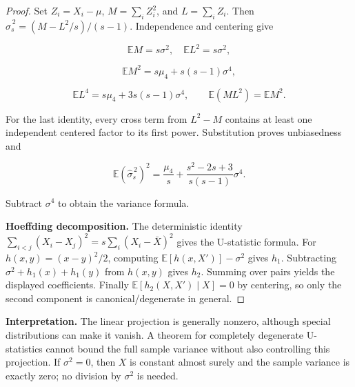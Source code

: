 \begin{proof}
Set $Z_i=X_i-\mu$, $M=\sum_iZ_i^2$, and $L=\sum_iZ_i$. Then $\widehat\sigma_s^{\,2}=(M-L^2/s)/(s-1)$. Independence and centering give


\begin{equation}
\mathbb EM=s\sigma^2,\quad\mathbb EL^2=s\sigma^2,
\end{equation}


\begin{equation}
\mathbb EM^2=s\mu_4+s(s-1)\sigma^4,
\end{equation}


\begin{equation}
\mathbb EL^4=s\mu_4+3s(s-1)\sigma^4,\qquad
\mathbb E(ML^2)=\mathbb EM^2.
\end{equation}


For the last identity, every cross term from $L^2-M$ contains at least one independent centered factor to its first power. Substitution proves unbiasedness and


\begin{equation}
\mathbb E(\widehat\sigma_s^{\,2})^2
=\frac{\mu_4}s+\frac{s^2-2s+3}{s(s-1)}\sigma^4.
\end{equation}


Subtract $\sigma^4$ to obtain the variance formula.


\textbf{Hoeffding decomposition.} The deterministic identity $\sum_{i<j}(X_i-X_j)^2=s\sum_i(X_i-\bar X)^2$ gives the U-statistic formula. For $h(x,y)=(x-y)^2/2$, computing $\mathbb E[h(x,X')]-\sigma^2$ gives $h_1$. Subtracting $\sigma^2+h_1(x)+h_1(y)$ from $h(x,y)$ gives $h_2$. Summing over pairs yields the displayed coefficients. Finally $\mathbb E[h_2(X,X')\mid X]=0$ by centering, so only the second component is canonical/degenerate in general.

\end{proof}


\textbf{Interpretation.} The linear projection is generally nonzero, although special distributions can make it vanish. A theorem for completely degenerate U-statistics cannot bound the full sample variance without also controlling this projection. If $\sigma^2=0$, then $X$ is constant almost surely and the sample variance is exactly zero; no division by $\sigma^2$ is needed.

